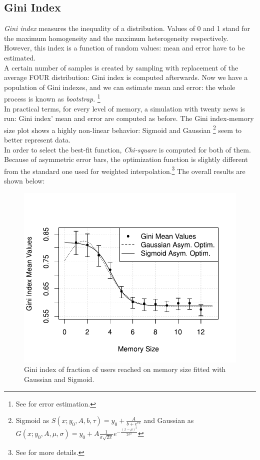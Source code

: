 \subsection{Gini Index}
\textit{Gini index}\cite{ginindex} measures the inequality of a
distribution. Values of 0 and 1 stand for the
maximum homogeneity and the maximum heterogeneity respectively.
However, this index is a function of random values: mean and
error have to be estimated.\\
A certain number of samples is created by sampling with replacement
of the average FOUR distribution: Gini index is
computed afterwards.
Now we have a population of Gini indexes, and we can estimate
mean and error: the whole process is known as
\textit{bootstrap}.
\footnote{See  for error estimation.}
\cite{bootstrap}\\
In practical terms, for every level of  memory, a simulation with
twenty news is run: Gini index' mean and error are computed
as before.
The Gini index-memory size plot shows a highly non-linear
behavior: Sigmoid and Gaussian
\footnote{Sigmoid as
  $S(x;y_0, A, b, \tau) = y_0 + \frac{A}{b + e^{\tau x}}$ and
  Gaussian as
  $G(x; y_0, A, \mu, \sigma) = y_0 + A\frac{1}{\sigma\sqrt{2\pi}}e^{-\frac{(x-\mu)^2}{2\sigma^2}}$
}
seem to better represent data.\\
In order to select the best-fit function, \textit{Chi-square} is
computed for both of them. \\
Because of asymmetric error bars, the optimization function is
slightly different from the standard one used for weighted
interpolation.\footnote{See  for more details.}
The overall results are shown below:
%
%
\begin{figure}[h]
  \centering
  \includegraphics[trim={0cm 0cm 0cm 1cm},clip,width=.8\columnwidth]{img/gini.pdf}
  \caption[Gini index on memory size]
  {Gini index of fraction of users reached on memory size
    fitted with Gaussian and Sigmoid.
  }
  \label{fig:gini}
\end{figure}
